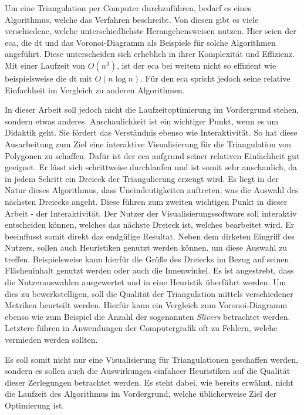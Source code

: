 \documentclass[12pt, twoside]{article}
\begin{document}
\begin{onehalfspacing}
  Um eine Triangulation per Computer durchzuführen, bedarf es eines Algorithmus, welche das Verfahren beschreibt. Von diesen gibt es viele verschiedene, welche unterschiedlichste Herangehensweisen nutzen.
  Hier seien der \ac{eca}, die \ac{dt} und das Voronoi-Diagramm als Beispiele für solche Algorithmen angeführt. Diese unterscheiden sich erheblich in ihrer Komplexität und Effizienz. 
  Mit einer Laufzeit von $O(n^3)$\cite{earclipping2}, ist der \ac{eca} bei weitem nicht so effizient wie beispielsweise die \ac{dt} mit $O(n\log n)$. Für den \ac{eca} spricht jedoch seine relative Einfachheit im Vergleich zu anderen Algorithmen.\linebreak 
  
  In dieser Arbeit soll jedoch nicht die Laufzeitoptimierung im Vordergrund stehen, sondern etwas anderes. Anschaulichkeit ist ein wichtiger Punkt, wenn es um Didaktik geht.
  Sie fördert das Verständnis ebenso wie Interaktivität. So hat diese Ausarbeitung zum Ziel eine interaktive Visualisierung für die Triangulation von Polygonen zu schaffen.
  Dafür ist der \ac{eca} aufgrund seiner relativen Einfachheit gut geeignet. Er lässt sich schrittweise durchlaufen und ist somit sehr anschaulich, da in jedem Schritt ein 
  Dreieck der Triangulierung erzeugt wird. Es liegt in der Natur dieses Algorithmus, dass Uneindeutigkeiten auftreten, was die Auswahl des nächsten Dreiecks angeht. Diese 
  führen zum zweiten wichtigen Punkt in dieser Arbeit - der Interaktivität. Der Nutzer der Visualisierungssoftware soll interaktiv entscheiden können, welches das nächste 
  Dreieck ist, welches bearbeitet wird. Er beeinflusst somit direkt das endgülige Resultat. Neben dem dirketen Eingriff des Nutzers, sollen auch Heuristiken genutzt werden 
  können, um diese Auswahl zu treffen. Beispielsweise kann hierfür die Größe des Dreiecks im Bezug auf seinen Flächeninhalt genutzt werden oder auch die Innenwinkel. 
  Es ist angestrebt, dass die Nutzerauswahlen ausgewertet und in eine Heuristik überführt werden. Um dies zu bewerkstelligen, soll die Qualität der Triangulation mittels verschiedener 
  Metriken beurteilt werden. Hierfür kann ein Vergleich zum Voronoi-Diagramm ebenso wie zum Beispiel die Anzahl der sogenannten \emph{Slivers}\cite{sliver} betrachtet werden. 
  Letztere führen in Anwendungen der Computergrafik oft zu Fehlern, welche vermieden werden sollten.
  
  Es soll somit nicht nur eine Visualisierung für Triangulationen geschaffen werden, sondern es sollen auch die Auswirkungen einfahcer Heuristiken auf die Qualität 
  dieser Zerlegungen betrachtet werden. Es steht dabei, wie bereits erwähnt, nicht die Laufzeit des Algorithmus im Vordergrund, welche üblicherweise Ziel der Optimierung ist.
  




\end{onehalfspacing}
\end{document}

